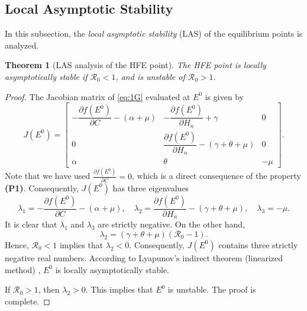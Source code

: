 \documentclass[11pt]{article}
\newtheorem{theorem}{Theorem}[section]
\theoremstyle{definition}
\theoremstyle{remark}
\numberwithin{equation}{section}
\begin{document}
\subsection{Local Asymptotic Stability}
In this subsection, the \textit{local asymptotic stability} (LAS) of the equilibrium points is analyzed.
\begin{theorem}[LAS analysis of the HFE point]\label{Lemma2}
The HFE point is locally asymptotically stable if $\mathcal{R}_0 < 1$, and is unstable of $\mathcal{R}_0>1$.
\end{theorem}
\begin{proof}
The Jacobian matrix of \eqref{eq:1G} evaluated at $E^0$ is given by
\begin{equation*}
   J(E^0) = \begin{bmatrix}
   -\dfrac{\partial f(E^0)}{\partial C} - (\alpha + \mu)&-\dfrac{\partial f(E^0)}{\partial H_n} + \gamma&0\\[4pt]
   0& \dfrac{\partial f(E^0)}{\partial H_n} - (\gamma + \theta + \mu)&0\\[4pt]
    \alpha&\theta&-\mu
    \end{bmatrix}.
\end{equation*}
Note that we have used $\frac{\partial f(E^0)}{\partial C} = 0$, which is a direct consequence of the property \textbf{(P1)}. 
Consequently, $J(E^0)$ has three eigenvalues 
\begin{equation*}
\lambda_1 = -\dfrac{\partial f(E^0)}{\partial C} - (\alpha + \mu), \quad \lambda_2 = \dfrac{\partial f(E^0)}{\partial H_n} - (\gamma + \theta + \mu),\quad \lambda_3 = -\mu.
\end{equation*}
It is clear that $\lambda_1$ and $\lambda_3$ are strictly negative. On the other hand, 
\begin{equation*}
\lambda_2 = (\gamma + \theta + \mu)(\mathcal{R}_0 - 1).
\end{equation*}
Hence, $\mathcal{R}_0 < 1$ implies that $\lambda_2 < 0$. 
Consequently, $J(E^0)$ contains three strictly negative real numbers. 
According to Lyapunov's indirect theorem (linearized method) \cite{Khalil, Stuart}, $E^0$ is locally asymptotically stable.

If $\mathcal{R}_0 > 1$, then $\lambda_2 > 0$. This implies that $E^0$ is unstable. 
The proof is complete.
\end{proof}
\end{document}
